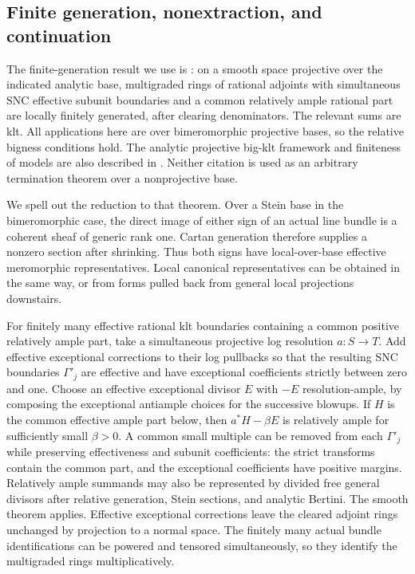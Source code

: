 \documentclass[11pt,letterpaper]{article}
\theoremstyle{definition}
\theoremstyle{remark}
\begin{document}
\subsection{Finite generation, nonextraction, and continuation}
\label{bir:finite-generation}

The finite-generation result we use is
\cite[Theorem~3.1]{DHPFourfoldMMP}: on a smooth space projective over
the indicated analytic base, multigraded rings of rational adjoints
with simultaneous SNC effective subunit boundaries and a common
relatively ample rational part are locally finitely generated, after
clearing denominators.  The relevant sums are klt.  All applications
here are over bimeromorphic projective bases, so the relative bigness
conditions hold.  The analytic projective big-klt framework and
finiteness of models are also described in
\cite[Theorem~E]{FujinoAnalyticMMP}.  Neither citation is used as an
arbitrary termination theorem over a nonprojective base.

We spell out the reduction to that theorem.  Over a Stein base in the
bimeromorphic case, the direct image of either sign of an actual line
bundle is a coherent sheaf of generic rank one.  Cartan generation
therefore supplies a nonzero section after shrinking.  Thus both signs
have local-over-base effective meromorphic representatives.  Local
canonical representatives can be obtained in the same way, or from
forms pulled back from general local projections downstairs.

For finitely many effective rational klt boundaries containing a
common positive relatively ample part, take a simultaneous projective
log resolution $a:S\to T$.  Add effective exceptional corrections to
their log pullbacks so that the resulting SNC boundaries
$\Gamma'_j$ are effective and have exceptional coefficients strictly
between zero and one.  Choose an effective exceptional divisor $E$
with $-E$ resolution-ample, by composing the exceptional antiample
choices for the successive blowups.  If $H$ is the common effective
ample part below, then $a^*H-\beta E$ is relatively ample for sufficiently
small $\beta>0$.  A common small multiple can be removed from each
$\Gamma'_j$ while preserving effectiveness and subunit coefficients:
the strict transforms contain the common part, and the exceptional
coefficients have positive margins.  Relatively ample summands may
also be represented by divided free general divisors after relative
generation, Stein sections, and analytic Bertini.  The smooth theorem
applies.  Effective exceptional corrections leave the cleared adjoint
rings unchanged by projection to a normal space.  The finitely many
actual bundle identifications can be powered and tensored
simultaneously, so they identify the multigraded rings multiplicatively.
\end{document}
